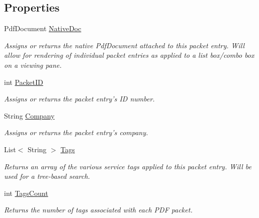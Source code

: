\subsection*{Properties}
\begin{DoxyCompactItemize}
\item 
Pdf\+Document \hyperlink{class_a_c_h_clerk_1_1_packet_entry_ab19c84887a206d860b73e2a1ac418459}{Native\+Doc}
\begin{DoxyCompactList}\small\item\em Assigns or returns the native Pdf\+Document attached to this packet entry. Will allow for rendering of individual packet entries as applied to a list box/combo box on a viewing pane. \end{DoxyCompactList}\item 
int \hyperlink{class_a_c_h_clerk_1_1_packet_entry_a1a2d184afd1ab9b8aaccf0ac9bdb5d62}{Packet\+I\+D}
\begin{DoxyCompactList}\small\item\em Assigns or returns the packet entry's I\+D number. \end{DoxyCompactList}\item 
String \hyperlink{class_a_c_h_clerk_1_1_packet_entry_adc6526f8427f62955cf5353e7067fff5}{Company}
\begin{DoxyCompactList}\small\item\em Assigns or returns the packet entry's company. \end{DoxyCompactList}\item 
List$<$ String $>$ \hyperlink{class_a_c_h_clerk_1_1_packet_entry_aa0e26c66a7884c983e91a014b6766f5e}{Tags}
\begin{DoxyCompactList}\small\item\em Returns an array of the various service tags applied to this packet entry. Will be used for a tree-\/based search. \end{DoxyCompactList}\item 
int \hyperlink{class_a_c_h_clerk_1_1_packet_entry_ae73ddc1eccfe1906754fbf36101e66eb}{Tags\+Count}
\begin{DoxyCompactList}\small\item\em Returns the number of tags associated with each P\+D\+F packet. \end{DoxyCompactList}\item 

\end{DoxyCompactItemize}
